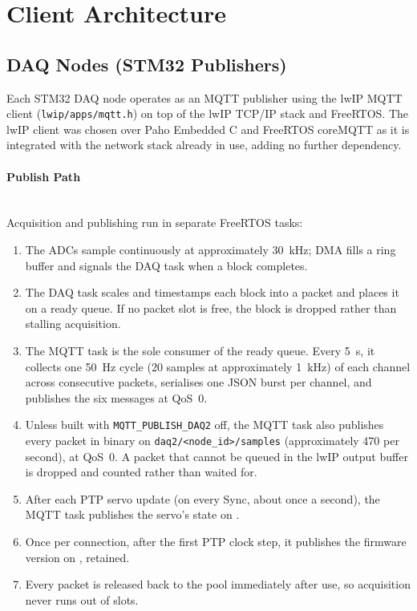 \section{Client Architecture}
\subsection{DAQ Nodes (STM32 Publishers)}
Each STM32 DAQ node operates as an MQTT publisher using the lwIP MQTT client (\texttt{lwip/apps/mqtt.h}) on top of the lwIP TCP/IP stack and FreeRTOS. The lwIP client was chosen over Paho Embedded C and FreeRTOS coreMQTT as it is integrated with the network stack already in use, adding no further dependency.

\paragraph{Publish Path} ~\\
Acquisition and publishing run in separate FreeRTOS tasks:
\begin{enumerate}[noitemsep]
  \item The ADCs sample continuously at approximately 30~kHz; DMA fills a ring buffer and signals the DAQ task when a block completes.
  \item The DAQ task scales and timestamps each block into a packet and places it on a ready queue. If no packet slot is free, the block is dropped rather than stalling acquisition.
  \item The MQTT task is the sole consumer of the ready queue. Every 5~s, it collects one 50~Hz cycle (20 samples at approximately 1~kHz) of each channel across consecutive packets, serialises one JSON burst per channel, and publishes the six messages at QoS~0.
  \item Unless built with \texttt{MQTT\_PUBLISH\_DAQ2} off, the MQTT task also publishes every packet in binary on \texttt{daq2/<node\_id>/samples} (approximately 470 per second), at QoS~0. A packet that cannot be queued in the lwIP output buffer is dropped and counted rather than waited for.
  \item After each PTP servo update (on every Sync, about once a second), the MQTT task publishes the servo's state on .
  \item Once per connection, after the first PTP clock step, it publishes the firmware version on , retained.
  \item Every packet is released back to the pool immediately after use, so acquisition never runs out of slots.
\end{enumerate}

